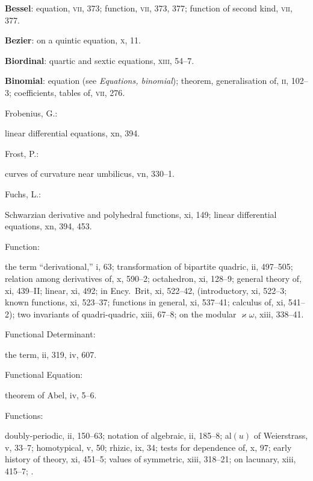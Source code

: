 \documentclass[11pt,a4paper]{book}
\providecommand{\V}[1]{#1}
\providecommand{\IndexEntry}[2]{#1\dotfill #2\par}
\begin{document}
\vspace{0.4em}
\textbf{Bessel}: equation, \textsc{vii}, 373; function, \textsc{vii}, 373, 377; function of second kind, \textsc{vii}, 377.

\vspace{0.4em}
\textbf{Bezier}: on a quintic equation, \textsc{x}, 11.

\vspace{0.4em}
\textbf{Biordinal}: quartic and sextic equations, \textsc{xiii}, 54--7.

\vspace{0.4em}
\textbf{Binomial}: equation (see \textit{Equations, binomial}); theorem, generalisation of, \textsc{ii}, 102--3; coefficients, tables of, \textsc{vii}, 276.
\clearpage


\twocolumn
\small

\thispagestyle{fancy}
\setcounter{page}{99}

\IndexEntry{Frobenius, G.}: linear differential equations, \V{xn}, 394.

\IndexEntry{Frost, P.}: curves of curvature near umbilicus, \V{vn}, 330--1.

\IndexEntry{Fuchs, L.}: Schwarzian derivative and polyhedral functions, \V{xi}, 149; linear differential equations, \V{xn}, 394, 453.

\IndexEntry{Function}: the term ``derivational,'' \V{i}, 63; transformation of bipartite quadric, \V{ii}, 497--505; relation among derivatives of, \V{x}, 590--2; octahedron, \V{xi}, 128--9; general theory of, \V{xi}, 439--II; linear, \V{xi}, 492; in Ency.\ Brit, \V{xi}, 522--42, (introductory, \V{xi}, 522--3; known functions, \V{xi}, 523--37; functions in general, \V{xi}, 537--41; calculus of, \V{xi}, 541--2); two invariants of quadri-quadric, \V{xiii}, 67--8; on the modular $\varkappa\omega$, \V{xiii}, 338--41.

\IndexEntry{Functional Determinant}: the term, \V{ii}, 319, \V{iv}, 607.

\IndexEntry{Functional Equation}: theorem of Abel, \V{iv}, 5--6.

\IndexEntry{Functions}: doubly-periodic, \V{ii}, 150--63; notation of algebraic, \V{ii}, 185--8; al$(u)$ of Weierstrass, \V{v}, 33--7; homotypical, \V{v}, 50; rhizic, \V{ix}, 34; tests for dependence of, \V{x}, 97; early history of theory, \V{xi}, 451--5; values of symmetric, \V{xiii}, 318--21; on lacunary, \V{xiii}, 415--7; .
\end{document}
